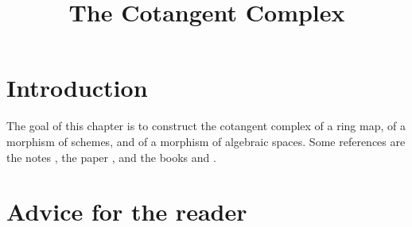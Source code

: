 

%


\title{The Cotangent Complex}


\maketitle

\label{section-phantom}

\tableofcontents

\section{Introduction}
\label{section-introduction}

\noindent
The goal of this chapter is to construct the cotangent complex of a
ring map, of a morphism of schemes, and of a morphism of algebraic spaces.
Some references are the notes \cite{quillenhomology}, the paper
\cite{quillencohomology}, and the books
\cite{Andre} and \cite{cotangent}.




\section{Advice for the reader}
\label{section-advice-reader}

